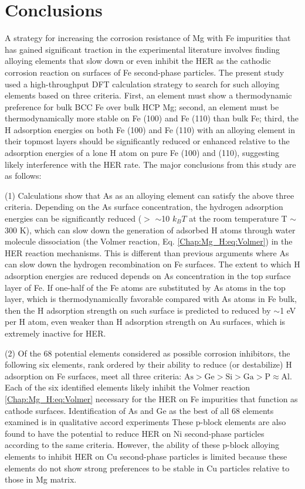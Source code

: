 \section{Conclusions}

A strategy for increasing the corrosion resistance of Mg with Fe impurities that has gained significant traction in the experimental literature involves finding alloying elements that slow down or even inhibit the HER as the cathodic corrosion reaction on surfaces of Fe second-phase particles. The present study used a high-throughput DFT calculation strategy to search for such alloying elements based on three criteria. First, an element must show a thermodynamic preference for bulk BCC Fe over bulk HCP Mg; second, an element must be thermodynamically more stable on Fe (100) and Fe (110) than bulk Fe; third, the H adsorption energies on both Fe (100) and Fe (110) with an alloying element in their topmost layers should be significantly reduced or enhanced relative to the adsorption energies of a lone H atom on pure Fe (100) and (110), suggesting likely interference with the HER rate. The major conclusions from this study are as follows:

(1) Calculations show that As as an alloying element can satisfy the above three criteria. Depending on the As surface concentration, the hydrogen adsorption energies can be significantly reduced ($>$ $\sim$10 $k_{B}T$ at the room temperature T $\sim$ 300 K), which can slow down the generation of adsorbed H atoms through water molecule dissociation (the Volmer reaction, Eq. \ref{Chap:Mg_H:eq:Volmer}) in the HER reaction mechanisms. This is different than previous arguments where As can slow down the hydrogen recombination on Fe surfaces. The extent to which H adsorption energies are reduced depends on As concentration in the top surface layer of Fe. If one-half of the Fe atoms are substituted by As atoms in the top layer, which is thermodynamically favorable compared with As atoms in Fe bulk, then the H adsorption strength on such surface is predicted to reduced by $\sim$1 eV per H atom, even weaker than H adsorption strength on Au surfaces, which is extremely inactive for HER.
 
(2) Of the 68 potential elements considered as possible corrosion inhibitors, the following six elements, rank ordered by their ability to reduce (or destabilize) H adsorption on Fe surfaces, meet all three criteria: $\text{As} > \text{Ge} > \text{Si} > \text{Ga} > \text{P} \approx \text{Al}$. Each of the six identified elements likely inhibit the Volmer reaction \ref{Chap:Mg_H:eq:Volmer} necessary for the HER on Fe impurities that function as cathode surfaces. Identification of As and Ge as the best of all 68 elements examined is in qualitative accord experiments These p-block elements are also found to have the potential to reduce \ac{HER} on Ni second-phase particles according to the same criteria. However, the ability of these p-block alloying elements to inhibit \ac{HER} on Cu second-phase particles is limited because these elements do not show strong preferences to be stable in Cu particles relative to those in Mg matrix.

